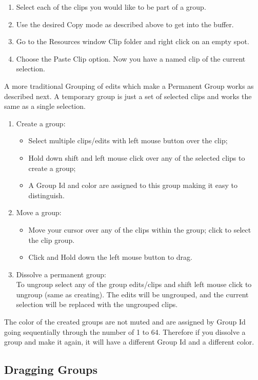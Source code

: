 \begin{enumerate}
\item Select  each of the clips you would like to be part of a
  group.
\item Use the desired Copy mode as described above to get into
  the buffer.
\item Go to the Resources window Clip folder and right click on
  an empty spot.
\item Choose the Paste Clip option.  Now you have a named clip
  of the current selection.
\end{enumerate} A more traditional Grouping of edits which make a
Permanent Group works as described next.  A temporary group is just
a set of selected clips and works the same as a single selection.
\begin{enumerate}
\item Create a group:
  \begin{itemize}[noitemsep]
  \item Select multiple clips/edits with left mouse button
    over the clip;
  \item Hold down shift and left mouse click over any of the
    selected clips to create a group;
  \item A Group Id and color are assigned to this group making
    it easy to distinguish.
  \end{itemize}
\item Move a group:
  \begin{itemize}[noitemsep]
  \item Move your cursor over any of the clips within the
    group; click to select the clip group.
  \item Click and Hold down the left mouse button to drag.
  \end{itemize}
\item Dissolve a permanent group:\\
  To ungroup select any of the group edits/clips and shift left
  mouse click to ungroup (same as creating).  The edits will be
  ungrouped, and the current selection will be replaced with the
  ungrouped clips.
\end{enumerate}

The color of the created groups are not muted and are assigned by
Group Id going sequentially through the number of 1 to 64.
Therefore if you dissolve a group and make it again, it will have a
different Group Id and a different color.

\subsection{Dragging Groups}%
\label{sub:dragging_groups}

